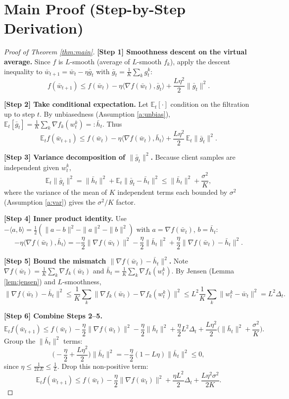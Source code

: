 \documentclass[11pt]{article}
\begin{document}
\section*{Main Proof (Step-by-Step Derivation)}

\begin{proof}[Proof of Theorem \ref{thm:main}]

\textbf{[Step 1] Smoothness descent on the virtual average.}
Since $f$ is $L$-smooth (average of $L$-smooth $f_k$), apply the descent
inequality to $\bar w_{t+1} = \bar w_t - \eta \bar g_t$ with
$\bar g_t = \frac1K\sum_k g_t^k$:
\[
f(\bar w_{t+1})
\le f(\bar w_t)
 - \eta \langle \nabla f(\bar w_t), \bar g_t\rangle
 + \frac{L\eta^2}{2}\|\bar g_t\|^2.
\]

\textbf{[Step 2] Take conditional expectation.}
Let $\mathbb{E}_t[\cdot]$ condition on the filtration up to step $t$.
By unbiasedness (Assumption \ref{a:unbias}),
$\mathbb{E}_t[\bar g_t] = \frac1K\sum_k \nabla f_k(w_t^k) =: \bar h_t$. Thus
\[
\mathbb{E}_t f(\bar w_{t+1})
\le f(\bar w_t)
 - \eta \langle \nabla f(\bar w_t), \bar h_t\rangle
 + \frac{L\eta^2}{2}\,\mathbb{E}_t\|\bar g_t\|^2.
\]

\textbf{[Step 3] Variance decomposition of $\|\bar g_t\|^2$.}
Because client samples are independent given $w_t^k$,
\[
\mathbb{E}_t\|\bar g_t\|^2
= \Big\|\bar h_t\Big\|^2
 + \mathbb{E}_t\Big\|\bar g_t - \bar h_t\Big\|^2
\le \|\bar h_t\|^2 + \frac{\sigma^2}{K},
\]
where the variance of the mean of $K$ independent terms each bounded by
$\sigma^2$ (Assumption \ref{a:var}) gives the $\sigma^2/K$ factor.

\textbf{[Step 4] Inner product identity.}
Use $-\langle a, b\rangle = \tfrac12(\|a-b\|^2 - \|a\|^2 - \|b\|^2)$ with
$a=\nabla f(\bar w_t)$, $b=\bar h_t$:
\[
- \eta\langle \nabla f(\bar w_t), \bar h_t\rangle
= -\frac{\eta}{2}\|\nabla f(\bar w_t)\|^2
  -\frac{\eta}{2}\|\bar h_t\|^2
  +\frac{\eta}{2}\|\nabla f(\bar w_t) - \bar h_t\|^2.
\]

\textbf{[Step 5] Bound the mismatch $\|\nabla f(\bar w_t) - \bar h_t\|^2$.}
Note $\nabla f(\bar w_t) = \frac1K\sum_k \nabla f_k(\bar w_t)$ and
$\bar h_t = \frac1K\sum_k \nabla f_k(w_t^k)$. By Jensen
(Lemma \ref{lem:jensen}) and $L$-smoothness,
\[
\|\nabla f(\bar w_t) - \bar h_t\|^2
\le \frac1K\sum_k \|\nabla f_k(\bar w_t) - \nabla f_k(w_t^k)\|^2
\le L^2 \frac1K\sum_k \|w_t^k - \bar w_t\|^2 = L^2 \Delta_t.
\]

\textbf{[Step 6] Combine Steps 2--5.}
\[
\mathbb{E}_t f(\bar w_{t+1})
\le f(\bar w_t)
 -\frac{\eta}{2}\|\nabla f(\bar w_t)\|^2
 -\frac{\eta}{2}\|\bar h_t\|^2
 +\frac{\eta}{2}L^2\Delta_t
 +\frac{L\eta^2}{2}\Big(\|\bar h_t\|^2 + \frac{\sigma^2}{K}\Big).
\]
Group the $\|\bar h_t\|^2$ terms:
\[
\Big(-\frac{\eta}{2} + \frac{L\eta^2}{2}\Big)\|\bar h_t\|^2
= -\frac{\eta}{2}(1 - L\eta)\|\bar h_t\|^2 \le 0,
\]
since $\eta \le \tfrac{1}{2LE} \le \tfrac{1}{L}$. Drop this non-positive term:
\[
\mathbb{E}_t f(\bar w_{t+1})
\le f(\bar w_t)
 -\frac{\eta}{2}\|\nabla f(\bar w_t)\|^2
 +\frac{\eta L^2}{2}\Delta_t
 +\frac{L\eta^2 \sigma^2}{2K}.
\]


\end{proof}
\end{document}
